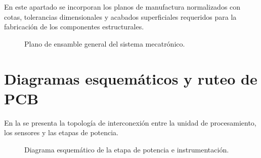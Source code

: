 En este apartado se incorporan los planos de manufactura normalizados con cotas, tolerancias dimensionales y acabados superficiales requeridos para la fabricación de los componentes estructurales.

\begin{figure}[htbp]
    \centering
    \caption{Plano de ensamble general del sistema mecatrónico.}
    \label{fig:plano-ensamble}
\end{figure}

\chapter{Diagramas esquemáticos y ruteo de PCB}
\label{ap:esquematicos}

En la  se presenta la topología de interconexión entre la unidad de procesamiento, los sensores y las etapas de potencia.

\begin{figure}[htbp]
    \centering
    \caption{Diagrama esquemático de la etapa de potencia e instrumentación.}
    \label{fig:diagrama-conexiones}
\end{figure}
